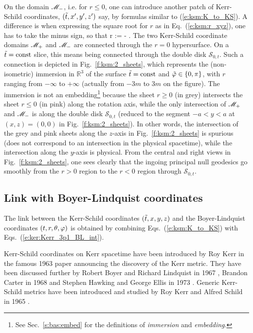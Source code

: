 On the domain $\mathscr{M}_-$, i.e. for $r\leq 0$,
one can introduce another patch of Kerr-Schild coordinates, $({\tilde t},x',y',z')$ say,
by formulas similar to (\ref{e:ksm:K_to_KS}). A difference is when expressing
the square root for $r$ as in Eq.~(\ref{e:ksm:r_xyz}), one has to take the
minus sign, so that
\be
    r := -  .
\ee
The two Kerr-Schild coordinate domains $\mathscr{M}_+$ and $\mathscr{M}_-$ are connected through
the $r=0$ hypersurface. On a ${\tilde t}=\mathrm{const}$ slice, this means being
connected through the double disk $\mathcal{S}_{0,t}$. Such a connection
is depicted in Fig.~\ref{f:ksm:2_sheets}, which represents the (non-isometric)
immersion in $\mathbb{R}^3$ of the surface ${\tilde t}=\mathrm{const}$ and ${\tilde\varphi}\in\{0,\pi\}$,
with $r$ ranging from $-\infty$ to $+\infty$ (actually from $-3m$ to $3m$
on the figure). The immersion is not an embedding\footnote{See Sec.~\ref{s:bas:embed}
for the definitions of \emph{immersion} and \emph{embedding}.} because the
sheet $r\geq 0$ (in grey) intersects the sheet $r\leq 0$ (in pink) along the
rotation axis, while the only intersection of $\mathscr{M}_+$ and $\mathscr{M}_-$ is along
the double disk $\mathcal{S}_{0,t}$ (reduced to the segment $-a < y< a$ at
$(x,z) = (0,0)$ in Fig.~\ref{f:ksm:2_sheets}). In other words, the intersection
of the grey and pink sheets along the $z$-axis in Fig.~\ref{f:ksm:2_sheets}
is spurious (does not correspond to an intersection in the physical spacetime),
while the intersection along the $y$-axis is physical.
From the central and right views in Fig.~\ref{f:ksm:2_sheets}, one sees clearly
that the ingoing principal null geodesics go smoothly from the $r > 0$ region
to the $r < 0$ region through $\mathcal{S}_{0,t}$.


\subsection{Link with Boyer-Lindquist coordinates}

The link between the Kerr-Schild coordinates $({\tilde t},x,y,z)$ and the Boyer-Lindquist
coordinates $(t,r,\theta,\varphi)$
is obtained by combining Eqs.~(\ref{e:ksm:K_to_KS}) with Eqs.~(\ref{e:ker:Kerr_3p1_BL_int}).


\begin{hist}
Kerr-Schild coordinates on Kerr spacetime have been introduced by Roy Kerr in the famous 1963 paper
\cite{Kerr63} announcing the discovery of the
Kerr metric. They have been discussed further by Robert Boyer and Richard Lindquist
in 1967 \cite{BoyerL67}, Brandon Carter in 1968
\cite{Carte68a}
and Stephen Hawking and George Ellis in 1973 \cite{HawkiE73}.
Generic Kerr-Schild metrics have been introduced and studied by Roy Kerr and Alfred
Schild
in 1965 \cite{KerrS65}.
\end{hist}

